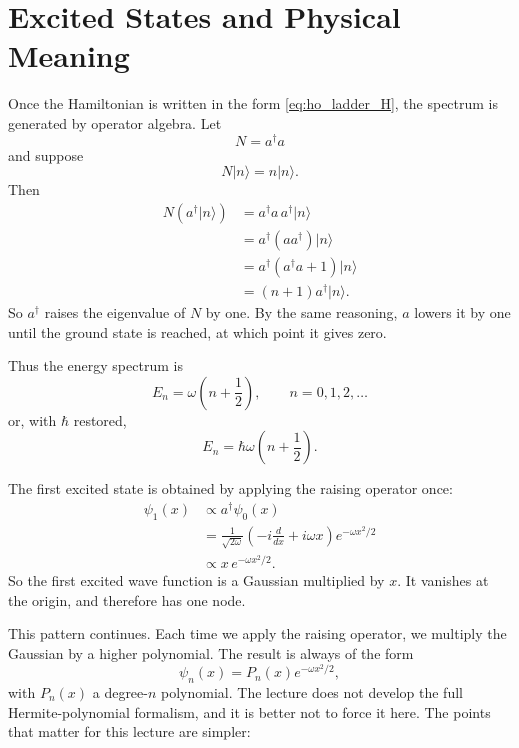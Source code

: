 \section{Excited States and Physical Meaning}

Once the Hamiltonian is written in the form \eqref{eq:ho_ladder_H}, the spectrum is generated by operator algebra. Let
\begin{equation}
N=a^{\dagger}a
\end{equation}
and suppose
\begin{equation}
N|n\rangle=n|n\rangle.
\end{equation}
Then
\begin{align}
N(a^{\dagger}|n\rangle)
&=
a^{\dagger}a\,a^{\dagger}|n\rangle \\
&=
a^{\dagger}(aa^{\dagger})|n\rangle \\
&=
a^{\dagger}(a^{\dagger}a+1)|n\rangle \\
&=
(n+1)a^{\dagger}|n\rangle.
\end{align}
So \(a^{\dagger}\) raises the eigenvalue of \(N\) by one. By the same reasoning, \(a\) lowers it by one until the ground state is reached, at which point it gives zero.

Thus the energy spectrum is
\begin{equation}
E_{n}=\omega\left(n+\frac{1}{2}\right),
\qquad n=0,1,2,\dots
\end{equation}
or, with \(\hbar\) restored,
\begin{equation}
E_{n}=\hbar\omega\left(n+\frac{1}{2}\right).
\end{equation}

The first excited state is obtained by applying the raising operator once:
\begin{align}
\psi_{1}(x)
&\propto
a^{\dagger}\psi_{0}(x) \\
&=
\frac{1}{\sqrt{2\omega}}
\left(
-i\frac{d}{dx}+i\omega x
\right)e^{-\omega x^{2}/2} \\
&\propto
x\,e^{-\omega x^{2}/2}.
\end{align}
So the first excited wave function is a Gaussian multiplied by \(x\). It vanishes at the origin, and therefore has one node.

This pattern continues. Each time we apply the raising operator, we multiply the Gaussian by a higher polynomial. The result is always of the form
\begin{equation}
\psi_{n}(x)=P_{n}(x)e^{-\omega x^{2}/2},
\end{equation}
with \(P_{n}(x)\) a degree-\(n\) polynomial. The lecture does not develop the full Hermite-polynomial formalism, and it is better not to force it here. The points that matter for this lecture are simpler:

